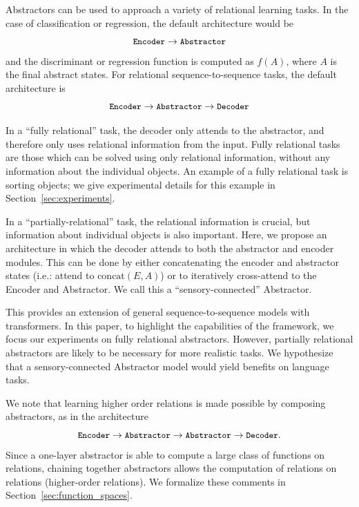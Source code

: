 Abstractors can be used to approach a variety of relational learning tasks. In the case of classification
or regression, the default architecture would be
$$\mbox{\small\texttt{Encoder}} \rightarrow \mbox{\small\texttt{Abstractor}}$$
and the discriminant or regression function is computed as $f(A)$, where $A$ is the final abstract states.
For relational sequence-to-sequence tasks, the default architecture is
$$\mbox{\small\texttt{Encoder}} \rightarrow \mbox{\small\texttt{Abstractor}} \rightarrow \mbox{\small\texttt{Decoder}}$$

In a ``fully relational'' task, the decoder only attends to the abstractor, and therefore only uses relational information from the input. Fully relational tasks are those which can be solved using only relational information, without any information about the individual objects. An example of a fully relational task is sorting objects; we give experimental details for this example in Section~\ref{sec:experiments}.

In a ``partially-relational'' task, the relational information is crucial, but information about individual objects is also important. Here, we propose an architecture in which the decoder attends to both the abstractor and encoder modules. This can be done by either concatenating the encoder and abstractor states (i.e.: attend to $\text{concat}(E, A)$) or to iteratively cross-attend to the Encoder and Abstractor. We call this a ``sensory-connected'' Abstractor.

This provides an extension of general sequence-to-sequence models with transformers. In this paper, to highlight the capabilities of the framework, we focus our experiments on fully relational abstractors. However, partially relational abstractors are likely to be necessary for more realistic tasks. We hypothesize that a sensory-connected Abstractor model would yield benefits on language tasks.

We note that learning higher order relations is made possible by composing
abstractors, as in the architecture
\begin{equation*}\mbox{\small\texttt{Encoder}} \rightarrow \mbox{\small\texttt{Abstractor}} \rightarrow \mbox{\small\texttt{Abstractor}} \rightarrow \mbox{\small\texttt{Decoder}}.
\end{equation*}
Since a one-layer abstractor is able to compute a large class of functions on relations, chaining together abstractors allows the computation of relations on relations (higher-order relations). We formalize these comments in Section~\ref{sec:function_spaces}.

